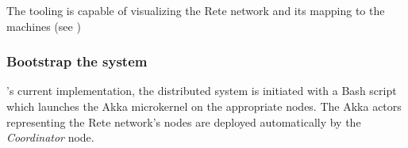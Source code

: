 
The tooling is capable of visualizing the Rete network and its mapping to the machines (see )


\subsubsection{Bootstrap the system}

\iqd{}'s current implementation, the distributed system is initiated with a Bash script which launches the Akka microkernel on the appropriate nodes. The Akka actors representing the Rete network's nodes are deployed automatically by the \iqd{} \textit{Coordinator} node.
